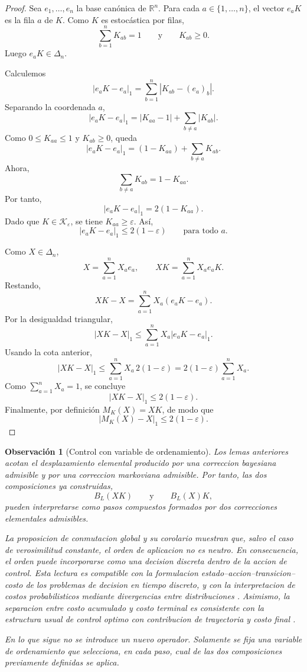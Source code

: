 \documentclass[12pt]{article}
\newtheorem{observacion}{Observación}[section]
\begin{document}
\begin{proof}
Sea \(e_1,\dots,e_n\) la base canónica de \(\mathbb R^n\). Para cada \(a\in\{1,\dots,n\}\), el vector \(e_aK\) es la fila \(a\) de \(K\). Como \(K\) es estocástica por filas,
\[
\sum_{b=1}^n K_{ab}=1
\qquad\text{y}\qquad
K_{ab}\ge0.
\]
Luego \(e_aK\in\Delta_n\).

Calculemos
\[
\left|e_aK-e_a\right|_1
=
\sum_{b=1}^n |K_{ab}-(e_a)_b|.
\]
Separando la coordenada \(a\),
\[
\left|e_aK-e_a\right|_1
=
|K_{aa}-1|+\sum_{b\ne a}|K_{ab}|.
\]
Como \(0\le K_{aa}\le1\) y \(K_{ab}\ge0\), queda
\[
\left|e_aK-e_a\right|_1
=
(1-K_{aa})+\sum_{b\ne a}K_{ab}.
\]
Ahora,
\[
\sum_{b\ne a}K_{ab}
=
1-K_{aa}.
\]
Por tanto,
\[
\left|e_aK-e_a\right|_1
=
2(1-K_{aa}).
\]
Dado que \(K\in\mathcal K_\varepsilon\), se tiene \(K_{aa}\ge\varepsilon\). Así,
\[
\left|e_aK-e_a\right|_1
\le
2(1-\varepsilon)
\qquad\text{para todo }a.
\]

Como \(X\in\Delta_n\),
\[
X=\sum_{a=1}^n X_a e_a,
\qquad
XK=\sum_{a=1}^n X_a e_aK.
\]
Restando,
\[
XK-X
=
\sum_{a=1}^n X_a(e_aK-e_a).
\]
Por la desigualdad triangular,
\[
\left|XK-X\right|_1
\le
\sum_{a=1}^n X_a\left|e_aK-e_a\right|_1.
\]
Usando la cota anterior,
\[
\left|XK-X\right|_1
\le
\sum_{a=1}^n X_a\,2(1-\varepsilon)
=
2(1-\varepsilon)\sum_{a=1}^n X_a.
\]
Como \(\sum_{a=1}^n X_a=1\), se concluye
\[
\left|XK-X\right|_1
\le
2(1-\varepsilon).
\]
Finalmente, por definición \(M_K(X)=XK\), de modo que
\[
\left|M_K(X)-X\right|_1
\le
2(1-\varepsilon).
\]
\end{proof}

\begin{observacion}[Control con variable de ordenamiento]
Los lemas anteriores acotan el desplazamiento elemental producido por una correccion bayesiana admisible y por una correccion markoviana admisible. Por tanto, las dos composiciones ya construidas,
\[
B_L(XK)
\qquad\text{y}\qquad
B_L(X)K,
\]
pueden interpretarse como pasos compuestos formados por dos correcciones elementales admisibles.

La proposicion de conmutacion global y su corolario muestran que, salvo el caso de verosimilitud constante, el orden de aplicacion no es neutro. En consecuencia, el orden puede incorporarse como una decision discreta dentro de la accion de control. Esta lectura es compatible con la formulacion estado--accion--transicion--costo de los problemas de decision en tiempo discreto, y con la interpretacion de costos probabilisticos mediante divergencias entre distribuciones \citep{Todorov2009EfficientComputationOptimalActions}. Asimismo, la separacion entre costo acumulado y costo terminal es consistente con la estructura usual de control optimo con contribucion de trayectoria y costo final \citep{Kappen2005LinearTheoryForControlOfNonLinearStochasticSystems}.

En lo que sigue no se introduce un nuevo operador. Solamente se fija una variable de ordenamiento que selecciona, en cada paso, cual de las dos composiciones previamente definidas se aplica.
\end{observacion}
\end{document}

